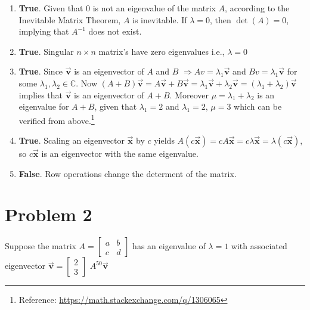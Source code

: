 \documentclass[letter,11pt]{article}
\theoremstyle{definition}
\begin{document}
\begin{tcolorbox}[boxrule=1mm,enhanced jigsaw, breakable,before=\hfill,after=\hfill,adjusted title={Problem 1 solutions}]

\begin{enumerate}[label = \roman*.]
    \item \textbf{True}. Given that $0$ is not an eigenvalue of the matrix $A$, according to the Inevitable Matrix Theorem, $A$ is inevitable. If $\lambda = 0$, then $\operatorname{det}(A) = 0$, implying that $A^{-1}$ does not exist.
    \item \textbf{True}. Singular $n\times n$ matrix's have zero eigenvalues i.e., $\lambda = 0$
    \item \textbf{True}. Since $\vec{\boldsymbol{v}}$ is an eigenvector of $A$ and $B$ $\Rightarrow A v=\lambda_1 \vec{\boldsymbol{v}}$ and $B v=\lambda_1 \vec{\boldsymbol{v}}$ for some $\lambda_1, \lambda_2 \in \mathbb{C}$. Now $(A+B) \vec{\boldsymbol{v}}=A \vec{\boldsymbol{v}}+B \vec{\boldsymbol{v}}=\lambda_1 \vec{\boldsymbol{v}}+\lambda_2 \vec{\boldsymbol{v}}=\left(\lambda_1+\lambda_2\right) \vec{\boldsymbol{v}}$ implies that $\vec{\boldsymbol{v}}$ is an eigenvector of $A+B$. Moreover $\mu=\lambda_1+\lambda_2$ is an eigenvalue for $A+B$, given that $\lambda_{1}=2$ and $\lambda_{1}=2$, $\mu = 3$ which can be verified from above.\footnote{Reference: \url{https://math.stackexchange.com/q/1306065}}
    \item \textbf{True}. Scaling an eigenvector $\vec{\boldsymbol{x}}$ by $c$ yields $A\left(c\vec{\boldsymbol{x}}\right) = cA\vec{\boldsymbol{x}} = c\lambda\vec{\boldsymbol{x}} = \lambda(c\vec{\boldsymbol{x}})$, so $c\vec{\boldsymbol{x}}$ is an eigenvector with the same eigenvalue.
    \item \textbf{False}. Row operations change the determent of the matrix.
\end{enumerate}
    
\end{tcolorbox}

\newpage
\section{Problem 2}

Suppose the matrix $A=\begin{bmatrix} a & b\\ c & d \end{bmatrix}$ has an eigenvalue of $\lambda = 1$ with associated eigenvector $\vec{\boldsymbol{v}} = \begin{bmatrix} 2\\3\end{bmatrix}$ $A^{50}\vec{\boldsymbol{v}}$
\end{document}
